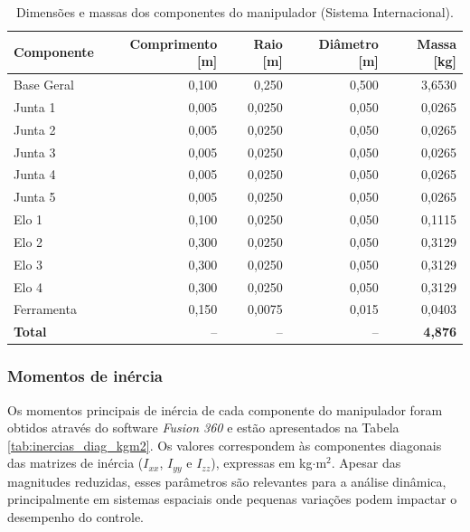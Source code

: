 \begin{table}[H]
\centering
\caption{Dimensões e massas dos componentes do manipulador (Sistema Internacional).}
\label{tab:dimensoes_massas_m_kg}
\begin{tabular}{l rrrr}
\hline
\textbf{Componente} & \textbf{Comprimento [m]} & \textbf{Raio [m]} & \textbf{Diâmetro [m]} & \textbf{Massa [kg]} \\
\hline
Base Geral   & 0{,}100 & 0{,}250  & 0{,}500 & 3{,}6530  \\
Junta 1      & 0{,}005 & 0{,}0250 & 0{,}050 & 0{,}0265 \\
Junta 2      & 0{,}005 & 0{,}0250 & 0{,}050 & 0{,}0265 \\
Junta 3      & 0{,}005 & 0{,}0250 & 0{,}050 & 0{,}0265 \\
Junta 4      & 0{,}005 & 0{,}0250 & 0{,}050 & 0{,}0265 \\
Junta 5      & 0{,}005 & 0{,}0250 & 0{,}050 & 0{,}0265 \\
Elo 1        & 0{,}100 & 0{,}0250 & 0{,}050 & 0{,}1115 \\
Elo 2        & 0{,}300 & 0{,}0250 & 0{,}050 & 0{,}3129 \\
Elo 3        & 0{,}300 & 0{,}0250 & 0{,}050 & 0{,}3129 \\
Elo 4        & 0{,}300 & 0{,}0250 & 0{,}050 & 0{,}3129 \\
Ferramenta   & 0{,}150 & 0{,}0075 & 0{,}015 & 0{,}0403 \\
\hline
\textbf{Total} & -- & -- & -- & \textbf{4{,}876} \\
\hline
\end{tabular}
\end{table}


\subsubsection{Momentos de inércia}
Os momentos principais de inércia de cada componente do manipulador foram obtidos através do software \emph{Fusion 360} e estão apresentados na Tabela \eqref{tab:inercias_diag_kgm2}. 
Os valores correspondem às componentes diagonais das matrizes de inércia ($I_{xx}$, $I_{yy}$ e $I_{zz}$), expressas em kg$\cdot$m$^{2}$. 
Apesar das magnitudes reduzidas, esses parâmetros são relevantes para a análise dinâmica, principalmente em sistemas espaciais onde pequenas variações podem impactar o desempenho do controle.

